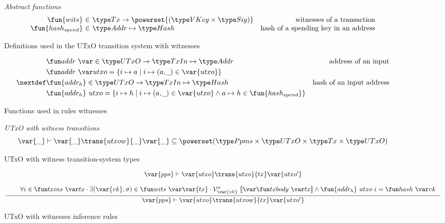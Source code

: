 \begin{figure}[htb]
  \emph{Abstract functions}
  \begin{equation*}
    \begin{array}{r@{~\in~}lr}
      \fun{wits} & \Tx \to \powerset{(\VKey \times \Sig)}
      & \text{witnesses of a transaction}\\
      \fun{hash_{spend}} & \Addr \mapsto \Hash
      & \text{hash of a spending key in an address}\\
    \end{array}
  \end{equation*}
  \caption{Definitions used in the UTxO transition system with witnesses}
  \label{fig:defs:utxow}
\end{figure}

\begin{figure}[htb]
  \begin{align*}
    & \addr{}{} \in \UTxO \to \TxIn \mapsto \Addr & \text{address of an input}\\
    & \addr{utxo} = \{ i \mapsto a \mid i \mapsto (a, \wcard) \in \var{utxo} \} \\
    \nextdef
    & \fun{addr_h} \in \UTxO \to \TxIn \mapsto \Hash & \text{hash of an input address}\\
    & \fun{addr_h}~utxo = \{ i \mapsto h \mid i \mapsto (a, \wcard) \in \var{utxo}
      \wedge a \mapsto h \in \fun{hash_{spend}} \}
  \end{align*}
  \caption{Functions used in rules witnesses}
  \label{fig:derived-defs:utxow}
\end{figure}

\begin{figure}
  \emph{UTxO with witness transitions}
  \begin{equation*}
    \var{\_} \vdash
    \var{\_} \trans{utxow}{\_} \var{\_}
    \subseteq \powerset (\PPMMap \times \UTxO \times \Tx \times \UTxO)
  \end{equation*}
  \caption{UTxO with witness transition-system types}
  \label{fig:ts-types:utxow}
\end{figure}

\begin{figure}
  \begin{equation}
    \label{eq:utxo-witness-inductive}
    \inference
    { \var{pps} \vdash \var{utxo} \trans{utxo}{tx} \var{utxo'}\\ ~ \\
      & \forall i \in \txins{tx} \cdot \exists (\var{vk}, \sigma) \in \wits{\var{tx}}
      \cdot
      \mathcal{V}^\sigma_{\var{vk}}~{\serialised{\txbody{tx}}}
      \wedge  \fun{addr_h}~{utxo}~i = \hash{vk}\\
    }
    {\var{pps} \vdash \var{utxo} \trans{utxow}{tx} \var{utxo'}}
  \end{equation}
  \caption{UTxO with witnesses inference rules}
  \label{fig:rules:utxow}
\end{figure}
